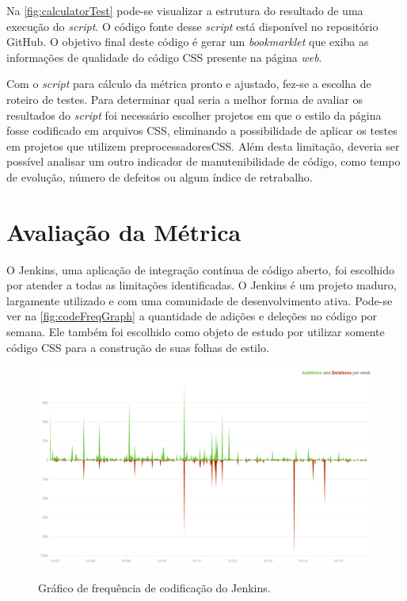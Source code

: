 Na \autoref{fig:calculatorTest} pode-se visualizar a estrutura do resultado de uma execução do \textit{script}. O código fonte desse \textit{script} está disponível no repositório GitHub\footnotemark. O objetivo final deste código é gerar um \textit{bookmarklet} que exiba as informações de qualidade do código CSS presente na página \textit{web}.


Com o \textit{script} para cálculo da métrica pronto e ajustado, fez-se a escolha de roteiro de testes. Para determinar qual seria a melhor forma de avaliar os resultados do \textit{script} foi necessário escolher projetos em que o estilo da página fosse codificado em arquivos CSS, eliminando a possibilidade de aplicar os testes em projetos que utilizem preprocessadores\footnotemark CSS. Além desta limitação, deveria ser possível analisar um outro indicador de manutenibilidade de código, como tempo de evolução, número de defeitos ou algum índice de retrabalho.


\chapter{Avaliação da Métrica}

O Jenkins\footnotemark, uma aplicação de integração contínua de código aberto, foi escolhido por atender a todas as limitações identificadas. O Jenkins é um projeto maduro, largamente utilizado e com uma comunidade de desenvolvimento ativa. Pode-se ver na \autoref{fig:codeFreqGraph} a quantidade de adições e deleções no código por semana. Ele também foi escolhido como objeto de estudo por utilizar somente código CSS para a construção de suas folhas de estilo.


\begin{figure}[!htb]
	\centering
	\caption{Gráfico de frequência de codificação do Jenkins.}
	\includegraphics[width=1\textwidth]{./04-figuras/code_freq_graph}
	\label{fig:codeFreqGraph}
\end{figure}

